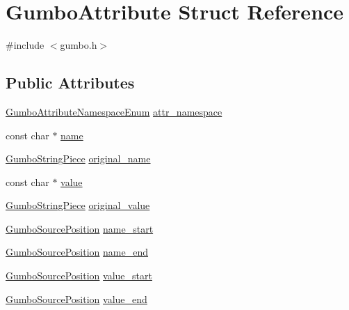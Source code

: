 \hypertarget{struct_gumbo_attribute}{}\section{Gumbo\+Attribute Struct Reference}
\label{struct_gumbo_attribute}


{\ttfamily \#include $<$gumbo.\+h$>$}

\subsection*{Public Attributes}
\begin{DoxyCompactItemize}
\item 
\mbox{\hyperlink{gumbo_8h_a030699170924efadb11b8e43a8681852}{Gumbo\+Attribute\+Namespace\+Enum}} \mbox{\hyperlink{struct_gumbo_attribute_a8393cdc691835a7aa3ffb8179969d8bf}{attr\+\_\+namespace}}
\item 
const char $\ast$ \mbox{\hyperlink{struct_gumbo_attribute_acafedb3e0f96b0fc51ea656ff949f05b}{name}}
\item 
\mbox{\hyperlink{struct_gumbo_string_piece}{Gumbo\+String\+Piece}} \mbox{\hyperlink{struct_gumbo_attribute_a6f535bba33535c0401bce8bc5459ffb3}{original\+\_\+name}}
\item 
const char $\ast$ \mbox{\hyperlink{struct_gumbo_attribute_ae4c9dc6fcd5614d17595e43f2a90da13}{value}}
\item 
\mbox{\hyperlink{struct_gumbo_string_piece}{Gumbo\+String\+Piece}} \mbox{\hyperlink{struct_gumbo_attribute_a578fc88b2b00d6468fb5445f71e11cda}{original\+\_\+value}}
\item 
\mbox{\hyperlink{struct_gumbo_source_position}{Gumbo\+Source\+Position}} \mbox{\hyperlink{struct_gumbo_attribute_a14f25692d8f8ad48560cbb27d0e792fc}{name\+\_\+start}}
\item 
\mbox{\hyperlink{struct_gumbo_source_position}{Gumbo\+Source\+Position}} \mbox{\hyperlink{struct_gumbo_attribute_a1cdfab1070ba0b3c584317a4d2cb8a0b}{name\+\_\+end}}
\item 
\mbox{\hyperlink{struct_gumbo_source_position}{Gumbo\+Source\+Position}} \mbox{\hyperlink{struct_gumbo_attribute_a8ee577ccb724a649538adce8bff17c86}{value\+\_\+start}}
\item 
\mbox{\hyperlink{struct_gumbo_source_position}{Gumbo\+Source\+Position}} \mbox{\hyperlink{struct_gumbo_attribute_a5b1fa5fb25a8bd65dc02f8a282a5c73e}{value\+\_\+end}}
\end{DoxyCompactItemize}


